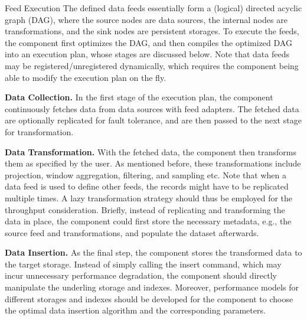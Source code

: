 \documentclass[conference]{llncs}
\makeatletter
\renewcommand\subsubsection{\@startsection{subsubsection}{3}{0mm} 
{-\baselineskip} 
{1\baselineskip} 
{\normalfont\normalsize\bfseries} 
}
\makeatother
\begin{document}
\subsubsection{Feed Execution}
The defined data feeds essentially form a (logical) directed acyclic graph (DAG), where the source nodes are data sources, the internal nodes are transformations, and the sink nodes are persistent storages.
To execute the feeds, the component first optimizes the DAG, and then compiles the optimized DAG into an execution plan, whose stages are discussed below.
Note that data feeds may be registered/unregistered dynamically, which requires the component being able to modify the execution plan on the fly.

\textbf{Data Collection.}
In the first stage of the execution plan, the component continuously fetches data from data sources with feed adapters.
The fetched data are optionally replicated for fault tolerance, and are then passed to the next stage for transformation.

\textbf{Data Transformation.}
With the fetched data, the component then transforms them as specified by the user.
As mentioned before, these transformations include projection, window aggregation, filtering, and sampling etc.
Note that when a data feed is used to define other feeds, the records might have to be replicated multiple times.
A lazy transformation strategy should thus be employed for the throughput consideration.
Briefly, instead of replicating and transforming the data in place, the component could first store the necessary metadata, e.g., the source feed and transformations, and populate the dataset afterwards.

\textbf{Data Insertion.}
As the final step, the component stores the transformed data to the target storage.
Instead of simply calling the insert command, which may incur unnecessary performance degradation, the component should directly manipulate the underling storage and indexes.
Moreover, performance models for different storages and indexes should be developed for the component to choose the optimal data insertion algorithm and the corresponding parameters.
\end{document}
